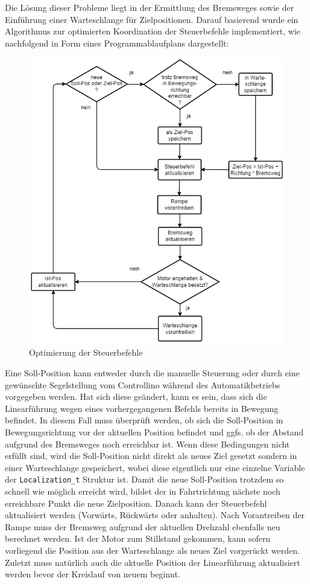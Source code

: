 \noindent
Die Lösung dieser Probleme liegt in der Ermittlung des Bremsweges sowie der Einführung einer Warteschlange für Zielpositionen. Darauf basierend wurde ein Algorithmus zur optimierten Koordination der Steuerbefehle implementiert, wie nachfolgend in Form eines Programmablaufplans dargestellt:
\begin{figure}[H]
	\centering
	\includegraphics[width=\linewidth]{images/Software/ControlOptimization.png}
	\caption{Optimierung der Steuerbefehle}
	\label{fig:controlOptimization}
\end{figure}
\noindent
Eine Soll-Position kann entweder durch die manuelle Steuerung oder durch eine gewünschte Segelstellung vom Controllino während des Automatikbetriebs vorgegeben werden. Hat sich diese geändert, kann es sein, dass sich die Linearführung wegen eines vorhergegangenen Befehls bereits in Bewegung befindet. In diesem Fall muss überprüft werden, ob sich die Soll-Position in Bewegungsrichtung vor der aktuellen Position befindet und ggfs. ob der Abstand aufgrund des Bremsweges noch erreichbar ist. Wenn diese Bedingungen nicht erfüllt sind, wird die Soll-Position nicht direkt als neues Ziel gesetzt sondern in einer Warteschlange gespeichert, wobei diese eigentlich nur eine einzelne Variable der \verb|Localization_t| Struktur ist. Damit die neue Soll-Position trotzdem so schnell wie möglich erreicht wird, bildet der in Fahrtrichtung nächste noch erreichbare Punkt die neue Zielposition. Danach kann der Steuerbefehl aktualisiert werden (Vorwärts, Rückwärts oder anhalten). Nach Vorantreiben der Rampe muss der Bremsweg aufgrund der aktuellen Drehzahl ebenfalls neu berechnet werden. Ist der Motor zum Stillstand gekommen, kann sofern vorliegend die Position aus der Warteschlange als neues Ziel vorgerückt werden. Zuletzt muss natürlich auch die aktuelle Position der Linearführung aktualisiert werden bevor der Kreislauf von neuem beginnt. \\

